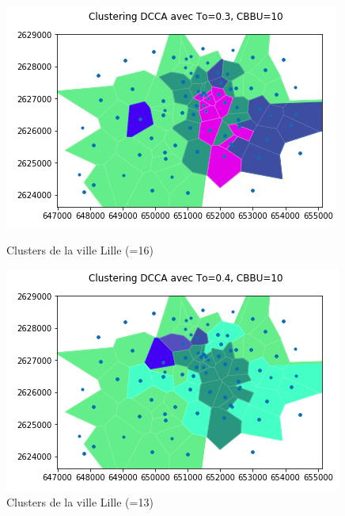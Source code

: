 \documentclass{report}
\begin{document}
\begin{figure}[H]
  \begin{minipage}{0.4\textwidth}
    \centering
    \includegraphics[scale=0.55]{images/To03.png}
    \caption{Clusters de la ville Lille (=16)}\label{Fig:Data1}
  \end{minipage}\hfill
  \begin{minipage}{0.4\textwidth}
    \centering
    \includegraphics[scale=0.55]{images/To04.png}
    \caption{Clusters de la ville Lille (=13)}\label{Fig:Data2}
  \end{minipage}
\end{figure} 
\end{document}
